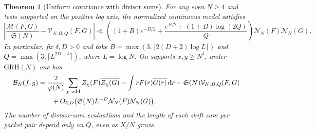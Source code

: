\documentclass[11pt,a4paper]{article}
\numberwithin{equation}{section}
\newtheorem{theorem}{Theorem}[section]
\newcommand{\SSS}{\mathfrak S}
\newcommand{\grh}{\mathrm{GRH}}
\newcommand{\ud}{\mathrm d}
\newcommand{\B}{\mathcal B_N}
\newcommand{\NN}{\mathcal N_N}
\begin{document}
\begin{theorem}[Uniform covariance with divisor sums]
\label{thm:divisorgridcovariance}
For any even $N\ge4$ and tests supported on the positive log axis,
the normalized continuous model satisfies
\begin{equation}
 \left|\frac{\mathcal M(F,G)}{\SSS(N)}-\mathcal V_{N;B,Q}(F,G)\right|
 \ll \left((1+B)e^{-B/2}
       +\frac{e^{B/2}+(1+B)\log(2Q)}{Q}\right)\NN(F)\NN(G).
 \label{eq:divisorgriderror}
\end{equation}
In particular, fix $\delta,D>0$ and take
$B=\max(3,\lceil2(D+2)\log L\rceil)$ and
$Q=\max(3,\lceil L^{2D+4}\rceil)$, where $L=\log N$.
On supports $x,y\ge N^\delta$, under $\grh(N)$ one has
\begin{align}
 \B(f,g)
 &=\frac{2}{\varphi(N)}\sum_{\chi\ {\rm odd}}
     Z_\chi(F)\overline{Z_\chi(G)}
    -\int rF(r)\overline{G(r)}\,\ud r
    -\SSS(N)\mathcal V_{N;B,Q}(F,G)\notag\\
 &\qquad+O_{\delta,D}\bigl(\SSS(N)L^{-D}\NN(F)\NN(G)\bigr).
 \label{eq:divisorgridcovariance}
\end{align}
The number of divisor-sum evaluations and the length of each shift
sum per packet pair depend only on $Q$, even as $X/N$ grows.
\end{theorem}
\end{document}

